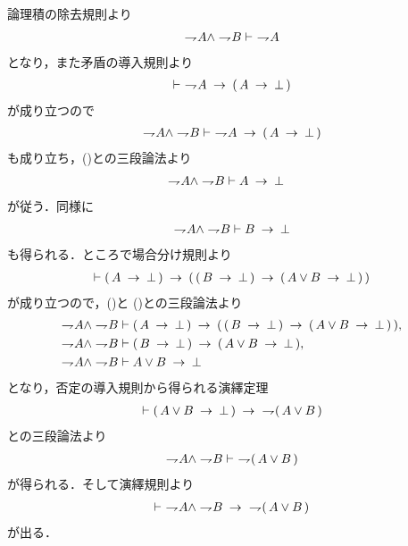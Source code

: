 	\begin{prf}
		論理積の除去規則より
		\begin{align}
			\negation A \wedge \negation B \vdash\ \negation A
			\label{fom:weak_De_Morgan_law_1_1}
		\end{align}
		となり，また矛盾の導入規則より
		\begin{align}
			\vdash\ \negation A \rarrow (\, A \rarrow \bot\, )
		\end{align}
		が成り立つので
		\begin{align}
			\negation A \wedge \negation B 
			\vdash\ \negation A \rarrow (\, A \rarrow \bot\, )
		\end{align}
		も成り立ち，()との三段論法より
		\begin{align}
			\negation A \wedge \negation B &\vdash A \rarrow \bot
			\label{fom:weak_De_Morgan_law_1_2}
		\end{align}
		が従う．同様に
		\begin{align}
			\negation A \wedge \negation B \vdash B \rarrow \bot
			\label{fom:weak_De_Morgan_law_1_3}
		\end{align}
		も得られる．ところで場合分け規則より
		\begin{align}
			\vdash (\, A \rarrow \bot\, ) \rarrow (\, (\, B \rarrow \bot\, )
			\rarrow (\, A \vee B \rarrow \bot\, )\, )
		\end{align}
		が成り立つので，()と
		()との三段論法より
		\begin{align}
			\negation A \wedge \negation B &\vdash (\, A \rarrow \bot\, ) 
			\rarrow (\, (\, B \rarrow \bot\, ) 
			\rarrow (\, A \vee B \rarrow \bot\, )\, ), \\
			\negation A \wedge \negation B &\vdash (\, B \rarrow \bot\, ) 
			\rarrow (\, A \vee B \rarrow \bot\, ), \\
			\negation A \wedge \negation B &\vdash A \vee B \rarrow \bot
		\end{align}
		となり，否定の導入規則から得られる演繹定理
		\begin{align}
			\vdash (\, A \vee B \rarrow \bot\, ) \rarrow\ \negation (\, A \vee B\, )
		\end{align}
		との三段論法より
		\begin{align}
			\negation A \wedge \negation B \vdash\ \negation (\, A \vee B\, ) 
		\end{align}
		が得られる．そして演繹規則より
		\begin{align}
			\vdash\ \negation A \wedge \negation B
				\rarrow\ \negation (\, A \vee B\, )
		\end{align}
		が出る．
		\QED
	\end{prf}
	
